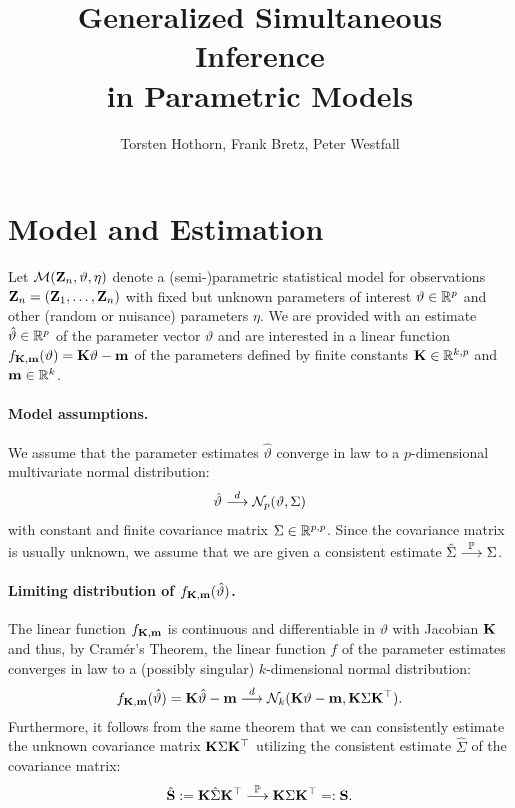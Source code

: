 \documentclass[12pt]{article}
\title{Generalized Simultaneous Inference \\ in Parametric Models}
\author{Torsten Hothorn, Frank Bretz, Peter Westfall}
\begin{document}
\maketitle

\section{Model and Estimation}

Let $\mathcal{M}(\mathbf{Z}_n, \vartheta, \eta)$ denote a (semi-)parametric statistical model
for observations $\mathbf{Z}_n = (\mathbf{Z}_1, \dots, \mathbf{Z}_n)$ with fixed
but unknown parameters of interest $\vartheta \in \mathbb{R}^p$ 
and other (random or nuisance) parameters $\eta$. We are provided 
with an estimate $\hat{\vartheta} \in \mathbb{R}^p$ of the parameter 
vector $\vartheta$ and are interested in a linear
function $f_{\mathbf{K}, \mathbf{m}}(\vartheta) = \mathbf{K} \vartheta - \mathbf{m}$
of the parameters defined by finite constants $\mathbf{K} \in \mathbb{R}^{k, p}$
and $\mathbf{m} \in \mathbb{R}^k$.

\paragraph{Model assumptions.}

We assume that the parameter estimates $\hat{\vartheta}$ converge in law
to a $p$-dimensional multivariate normal distribution:
\begin{eqnarray} \label{normality}
\hat{\vartheta} \stackrel{d}{\longrightarrow} \mathcal{N}_p(\vartheta, \Sigma)
\end{eqnarray}
with constant and finite covariance matrix $\Sigma \in \mathbb{R}^{p,p}$.
Since the covariance matrix is usually unknown, we assume 
that we are given a consistent estimate $\hat{\Sigma} \stackrel{\mathbb{P}}{\longrightarrow} \Sigma$.

\paragraph{Limiting distribution of $f_{\mathbf{K},\mathbf{m}}(\hat{\vartheta})$.}

The linear function $f_{\mathbf{K}, \mathbf{m}}$ is continuous and differentiable in
$\vartheta$ with Jacobian $\mathbf{K}$ and thus, by Cram{\'e}r's Theorem, 
the linear function $f$ of the parameter estimates
converges in law to a (possibly singular) $k$-dimensional normal distribution:
\begin{eqnarray} \label{dist_f}
f_{\mathbf{K}, \mathbf{m}}(\hat{\vartheta}) = \mathbf{K} \hat{\vartheta} - \mathbf{m} 
\stackrel{d}{\longrightarrow} \mathcal{N}_k(\mathbf{K} \vartheta - \mathbf{m}, \mathbf{K} \Sigma \mathbf{K}^\top).
\end{eqnarray}
Furthermore, it follows from the same theorem that we can 
consistently estimate the unknown covariance matrix $\mathbf{K} \Sigma \mathbf{K}^\top$ utilizing
the consistent estimate $\hat{\Sigma}$ of the covariance matrix:
\begin{eqnarray*}
\hat{\mathbf{S}} := \mathbf{K} \hat{\Sigma} \mathbf{K}^\top \stackrel{\mathbb{P}}{\longrightarrow} \mathbf{K} \Sigma \mathbf{K}^\top =: \mathbf{S}.
\end{eqnarray*}
\end{document}

